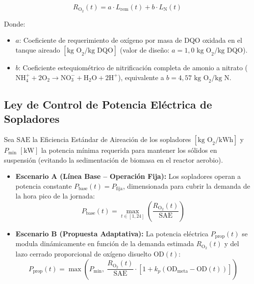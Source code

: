 \documentclass[11pt, a4paper]{article}
\begin{document}
\begin{equation}
    R_{\text{O}_2}(t) = a \cdot L_{\text{rem}}(t) + b \cdot L_{\text{N}}(t)
    \label{eq:demanda_o2}
\end{equation}

Donde:
\begin{itemize}
    \item $a$: Coeficiente de requerimiento de oxígeno por masa de $\text{DQO}$ oxidada en el tanque aireado $\left[\text{kg O}_2/\text{kg DQO}\right]$ (valor de diseño: $a = 1{,}0\text{ kg O}_2/\text{kg DQO}$).
    \item $b$: Coeficiente estequiométrico de nitrificación completa de amonio a nitrato ($\text{NH}_4^+ + 2\text{O}_2 \rightarrow \text{NO}_3^- + \text{H}_2\text{O} + 2\text{H}^+$), equivalente a $b = 4{,}57\text{ kg O}_2/\text{kg N}$.
\end{itemize}

\subsection{Ley de Control de Potencia Eléctrica de Sopladores}
Sea $\text{SAE}$ la Eficiencia Estándar de Aireación de los sopladores $\left[\text{kg O}_2/\text{kWh}\right]$ y $P_{\text{min}}$ $\left[\text{kW}\right]$ la potencia mínima requerida para mantener los sólidos en suspensión (evitando la sedimentación de biomasa en el reactor aerobio).

\begin{itemize}
    \item \textbf{Escenario A (Línea Base -- Operación Fija):}
    Los sopladores operan a potencia constante $P_{\text{base}}(t) = P_{\text{fija}}$, dimensionada para cubrir la demanda de la hora pico de la jornada:
    \begin{equation}
        P_{\text{base}}(t) = \max_{t \in [1,24]} \left(\frac{R_{\text{O}_2}(t)}{\text{SAE}}\right)
    \end{equation}

    \item \textbf{Escenario B (Propuesta Adaptativa):}
    La potencia eléctrica $P_{\text{prop}}(t)$ se modula dinámicamente en función de la demanda estimada $R_{\text{O}_2}(t)$ y del lazo cerrado proporcional de oxígeno disuelto $\text{OD}(t)$:
    \begin{equation}
        P_{\text{prop}}(t) = \max\left( P_{\text{min}}, \; \frac{R_{\text{O}_2}(t)}{\text{SAE}} \cdot \left[ 1 + k_p \left(\text{OD}_{\text{meta}} - \text{OD}(t)\right) \right] \right)
        \label{eq:potencia_adaptativa}
    \end{equation}
\end{itemize}
\end{document}
